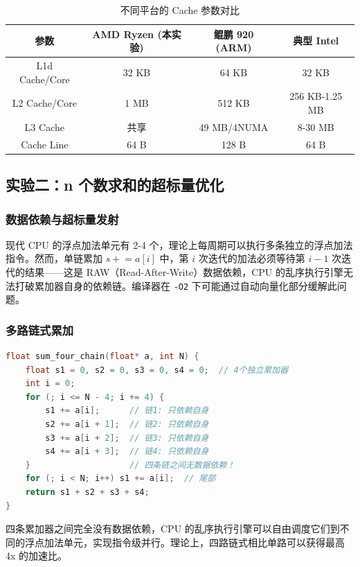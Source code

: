 \documentclass[a4paper]{article}
\begin{document}
\begin{table}[H]
\centering
\caption{不同平台的 Cache 参数对比}
\begin{tabular}{|c|c|c|c|}
\hline
参数 & AMD Ryzen (本实验) & 鲲鹏 920 (ARM) & 典型 Intel \\
\hline
L1d Cache/Core & 32 KB & 64 KB & 32 KB \\
L2 Cache/Core & 1 MB & 512 KB & 256 KB-1.25 MB \\
L3 Cache & 共享 & 49 MB/4NUMA & 8-30 MB \\
Cache Line & 64 B & 128 B & 64 B \\
\hline
\end{tabular}
\end{table}

\subsection{实验二：n 个数求和的超标量优化}

\subsubsection{数据依赖与超标量发射}

现代 CPU 的浮点加法单元有 2-4 个，理论上每周期可以执行多条独立的浮点加法指令。然而，单链累加 $s \mathrel{+}= a[i]$ 中，第 $i$ 次迭代的加法必须等待第 $i-1$ 次迭代的结果——这是 RAW（Read-After-Write）数据依赖，CPU 的乱序执行引擎无法打破累加器自身的依赖链。编译器在 \texttt{-O2} 下可能通过自动向量化部分缓解此问题。

\subsubsection{多路链式累加}

\begin{lstlisting}[title=四路链式累加（打破数据依赖）,frame=trbl,language={C++}]
float sum_four_chain(float* a, int N) {
    float s1 = 0, s2 = 0, s3 = 0, s4 = 0;  // 4个独立累加器
    int i = 0;
    for (; i <= N - 4; i += 4) {
        s1 += a[i];      // 链1: 只依赖自身
        s2 += a[i + 1];  // 链2: 只依赖自身
        s3 += a[i + 2];  // 链3: 只依赖自身
        s4 += a[i + 3];  // 链4: 只依赖自身
    }                    // 四条链之间无数据依赖！
    for (; i < N; i++) s1 += a[i];  // 尾部
    return s1 + s2 + s3 + s4;
}
\end{lstlisting}

四条累加器之间完全没有数据依赖，CPU 的乱序执行引擎可以自由调度它们到不同的浮点加法单元，实现指令级并行。理论上，四路链式相比单路可以获得最高 4x 的加速比。
\end{document}
